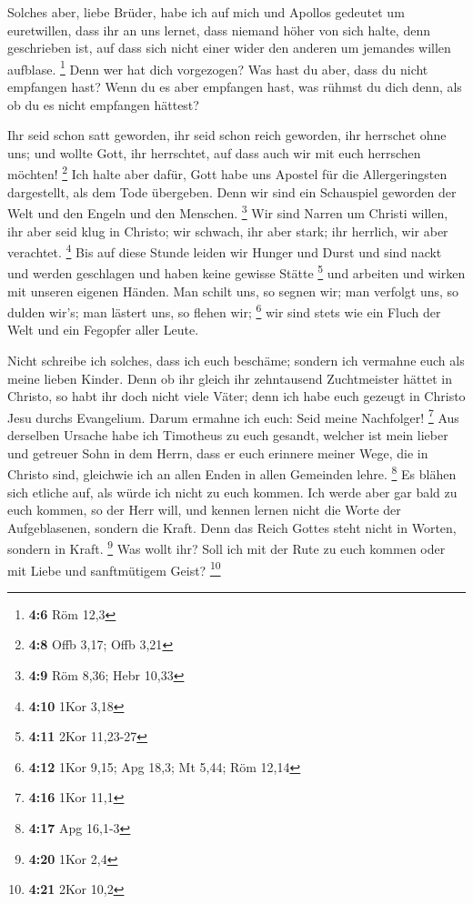  Solches aber, liebe Brüder, habe ich auf mich und Apollos
gedeutet um euretwillen, dass ihr an uns lernet, dass niemand höher von
sich halte, denn geschrieben ist, auf dass sich nicht einer wider den
anderen um jemandes willen aufblase. \footnote{\textbf{4:6} Röm 12,3}
 Denn wer hat dich vorgezogen? Was hast du aber, dass du
nicht empfangen hast? Wenn du es aber empfangen hast, was rühmst du dich
denn, als ob du es nicht empfangen hättest?

 Ihr seid schon satt geworden, ihr seid schon reich
geworden, ihr herrschet ohne uns; und wollte Gott, ihr herrschtet, auf
dass auch wir mit euch herrschen möchten! \footnote{\textbf{4:8} Offb
  3,17; Offb 3,21}  Ich halte aber dafür, Gott habe uns
Apostel für die Allergeringsten dargestellt, als dem Tode übergeben.
Denn wir sind ein Schauspiel geworden der Welt und den Engeln und den
Menschen. \footnote{\textbf{4:9} Röm 8,36; Hebr 10,33} 
Wir sind Narren um Christi willen, ihr aber seid klug in Christo; wir
schwach, ihr aber stark; ihr herrlich, wir aber verachtet. \footnote{\textbf{4:10}
  1Kor 3,18}  Bis auf diese Stunde leiden wir Hunger und
Durst und sind nackt und werden geschlagen und haben keine gewisse
Stätte \footnote{\textbf{4:11} 2Kor 11,23-27}  und
arbeiten und wirken mit unseren eigenen Händen. Man schilt uns, so
segnen wir; man verfolgt uns, so dulden wir's; man lästert uns, so
flehen wir; \footnote{\textbf{4:12} 1Kor 9,15; Apg 18,3; Mt 5,44; Röm
  12,14}  wir sind stets wie ein Fluch der Welt und ein
Fegopfer aller Leute.

 Nicht schreibe ich solches, dass ich euch beschäme;
sondern ich vermahne euch als meine lieben Kinder.  Denn
ob ihr gleich ihr zehntausend Zuchtmeister hättet in Christo, so habt
ihr doch nicht viele Väter; denn ich habe euch gezeugt in Christo Jesu
durchs Evangelium.  Darum ermahne ich euch: Seid meine
Nachfolger! \footnote{\textbf{4:16} 1Kor 11,1}  Aus
derselben Ursache habe ich Timotheus zu euch gesandt, welcher ist mein
lieber und getreuer Sohn in dem Herrn, dass er euch erinnere meiner
Wege, die in Christo sind, gleichwie ich an allen Enden in allen
Gemeinden lehre. \footnote{\textbf{4:17} Apg 16,1-3}  Es
blähen sich etliche auf, als würde ich nicht zu euch kommen.
 Ich werde aber gar bald zu euch kommen, so der Herr
will, und kennen lernen nicht die Worte der Aufgeblasenen, sondern die
Kraft.  Denn das Reich Gottes steht nicht in Worten,
sondern in Kraft. \footnote{\textbf{4:20} 1Kor 2,4}  Was
wollt ihr? Soll ich mit der Rute zu euch kommen oder mit Liebe und
sanftmütigem Geist? \footnote{\textbf{4:21} 2Kor 10,2}

